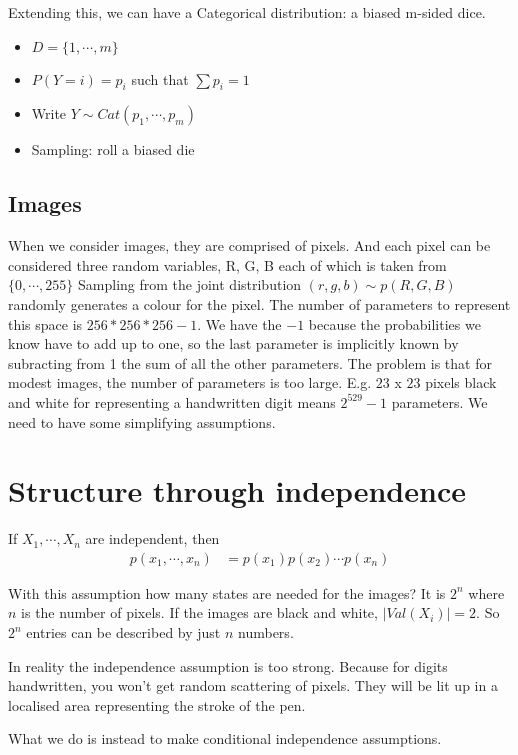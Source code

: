 \documentclass{article}
\begin{document}
Extending this, we can have a Categorical distribution: a biased m-sided dice.
\begin{itemize}
    \item $ D = \{ 1, \cdots, m \} $
    \item $ P(Y=i) = p_{i} $ such that $ \sum p_{i} = 1 $
    \item Write $ Y \sim Cat(p_{1}, \cdots, p_{m}) $
    \item Sampling: roll a biased die
\end{itemize}

\subsection{Images}
When we consider images, they are comprised of pixels.  And each pixel can be considered three random variables, R, G, B each of which is taken from $ \{ 0, \cdots , 255 \} $
Sampling from the joint distribution $ (r, g, b) \sim p(R, G, B) $ randomly generates a colour for the pixel.
The number of parameters to represent this space is $ 256 * 256 * 256 - 1 $.
We have the $ -1 $ because the probabilities we know have to add up to one, so the last parameter is implicitly known by subracting from 1 the sum of all the other parameters.
The problem is that for modest images, the number of parameters is too large.  E.g. $ 23 $ x $ 23 $ pixels black and white for representing a handwritten digit means $ 2^{529} -1 $ parameters.
We need to have some simplifying assumptions.

\section{Structure through independence}

If $ X_{1}, \cdots , X_{n} $ are independent, then
\begin{align}
p(x_{1}, \cdots , x_{n}) &= p(x_{1})p(x_{2})\cdots p(x_{n})
\end{align}

With this assumption how many states are needed for the images? 
It is $ 2^{n} $ where $n$ is the number of pixels.
If the images are black and white, $ |Val(X_{i})| = 2 $. So $2^{n}$ entries can be described by just $n$ numbers.

In reality the independence assumption is too strong.  Because for digits handwritten, you won't get random scattering of pixels.  They will be lit up in a localised area representing the stroke of the pen.

What we do is instead to make conditional independence assumptions.
\end{document}
